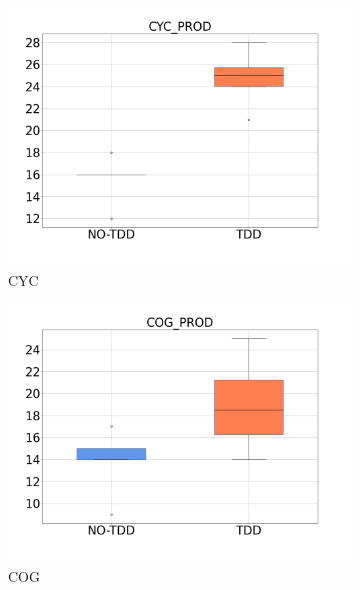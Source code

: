 \begin{figure}[H]
    \medskip
    \begin{subfigure}{0.33\textwidth}
        \includegraphics[width=\linewidth]{figures/box_plots/task1/CYC.png}
        \caption{CYC}
        \label{bp_task1_cyc}
    \end{subfigure}\hfil
    \begin{subfigure}{0.33\textwidth}
        \includegraphics[width=\linewidth]{figures/box_plots/task1/COG.png}
        \caption{COG}
        \label{bp_task1_cog}
    \end{subfigure}\hfil
    \begin{subfigure}{0.33\textwidth}

\end{subfigure}
\end{figure}
